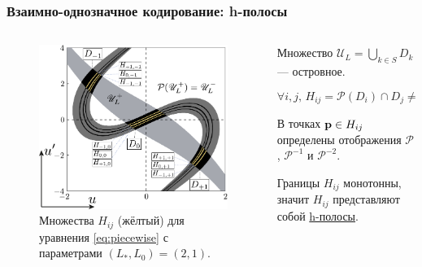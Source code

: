\documentclass [10pt] {beamer}
\begin{document}
\begin{frame}
	\frametitle{Взаимно-однозначное кодирование: h-полосы}
	
	\begin{columns}
		\begin{column}{.5\textwidth}
			\begin{figure}
			\includegraphics[width = 1\textwidth]{pic/h-strips for piecewise equation.pdf}
			\caption{Множества $H_{ij}$ (жёлтый) для уравнения \eqref{eq:piecewise} с параметрами $(L_*, L_0) = (2, 1)$.}
			\end{figure}
		\end{column}
		\begin{column}{.5\textwidth}
			Множество $\mathscr{U}_L = \bigcup_{k \in S} D_k$ --- островное.
		
			\vspace{5pt}
		
			\begin{equation*}
				\forall i, j, \, H_{ij} = \mathcal{P}(D_i) \cap D_j \neq \varnothing	
			\end{equation*}

			\vspace{5pt}
			
			В точках $\vb{p} \in H_{ij}$ определены отображения $\mathcal{P}$, $\mathcal{P}^{-1}$ и $\mathcal{P}^{-2}$.
			
			\vspace{10pt}
			
			Границы $H_{ij}$ монотонны, значит $H_{ij}$ представляют собой \underline{h-полосы}.
		\end{column}
	\end{columns}
\end{frame}
\end{document}
